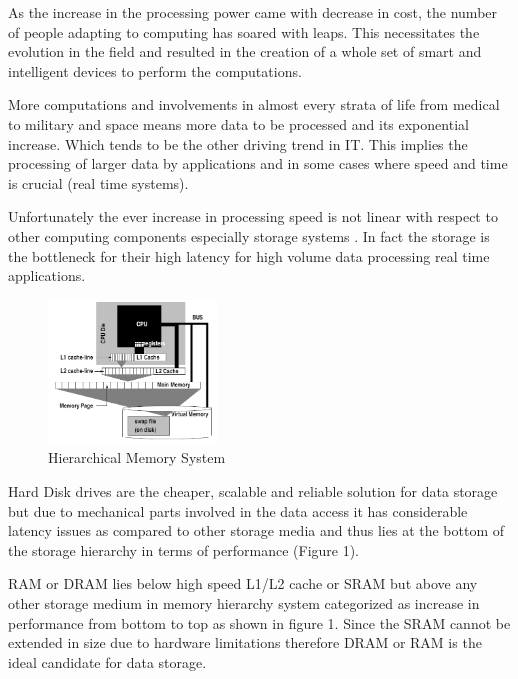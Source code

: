 \documentclass[12pt]{article} %
\begin{document}
As the increase in the processing power came with decrease in cost, the number of people adapting to computing has soared with leaps. This necessitates the evolution in the field and resulted in the creation of a whole set of smart and intelligent devices to perform the computations. 

More computations and involvements in almost every strata of life from medical to military and space means more data to be processed and its exponential increase. Which tends to be the other driving trend in IT. This implies the processing of larger data by applications and in some cases where speed and time is crucial (real time systems).

Unfortunately the ever increase in processing speed is not linear with respect to other computing components especially storage systems \cite{boncz1999database}. In fact the storage is the bottleneck for their high latency for high volume data processing real time applications. 

\begin{figure}
  \begin{center}
    \includegraphics[width=0.4\textwidth]{./pictures/Fig1}
  \end{center}
  \caption{Hierarchical Memory System}
  \label{fig:fig1}
\end{figure}

Hard Disk drives are the cheaper, scalable and reliable solution for data storage but due to mechanical parts involved in the data access it has considerable latency issues as compared to other storage media and thus lies at the bottom of the storage hierarchy in terms of performance (Figure 1).

RAM or DRAM lies below high speed L1/L2 cache or SRAM but above any other storage medium in memory hierarchy system categorized as increase in performance from bottom to top as shown in figure 1. Since the SRAM cannot be extended in size due to hardware limitations therefore DRAM or RAM is the ideal candidate for data storage.
\end{document}

